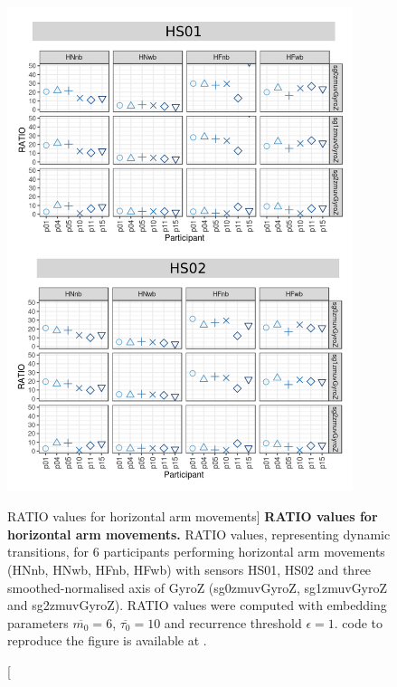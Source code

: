 \begin{figure}
\centering
\includegraphics[width=0.9\textwidth]{rqa_ratio_H_w500}
    \caption
	[RATIO values for horizontal arm movements]{
	{\bf RATIO values for horizontal arm movements.}	
	RATIO values, representing dynamic transitions, 
	for 6 participants performing horizontal arm movements 
	(HNnb, HNwb, HFnb, HFwb)
	with sensors HS01, HS02 and three smoothed-normalised axis 
	of GyroZ (sg0zmuvGyroZ, sg1zmuvGyroZ and sg2zmuvGyroZ).
	RATIO values were computed with 
	embedding parameters $\overline{m_0}=6$, $\overline{\tau_0}=10$ and
	recurrence threshold $\epsilon=1$.
		\R code to reproduce the figure is available at 
		.
        }
    \label{fig:rqa_ratio_H}
\end{figure}
